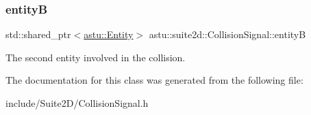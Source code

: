 \subsubsection{\texorpdfstring{entityB}{entityB}}
{\footnotesize\ttfamily std\+::shared\+\_\+ptr$<$\hyperlink{classastu_1_1Entity}{astu\+::\+Entity}$>$ astu\+::suite2d\+::\+Collision\+Signal\+::entityB}

The second entity involved in the collision. 

The documentation for this class was generated from the following file\+:\begin{DoxyCompactItemize}
\item 
include/\+Suite2\+D/Collision\+Signal.\+h\end{DoxyCompactItemize}
